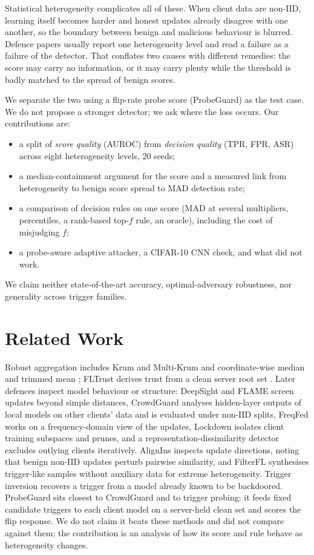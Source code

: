 Statistical heterogeneity complicates all of these. When client data are non-IID, learning itself becomes harder \cite{li2022niid} and honest updates already disagree with one another, so the boundary between benign and malicious behaviour is blurred. Defence papers usually report one heterogeneity level and read a failure as a failure of the detector. That conflates two causes with different remedies: the score may carry no information, or it may carry plenty while the threshold is badly matched to the spread of benign scores.

We separate the two using a flip-rate probe score (ProbeGuard) as the test case. We do not propose a stronger detector; we ask where the loss occurs. Our contributions are:
\begin{itemize}
\item a split of \emph{score quality} (AUROC) from \emph{decision quality} (TPR, FPR, ASR) across eight heterogeneity levels, 20 seeds;
\item a median-containment argument for the score and a measured link from heterogeneity to benign score spread to MAD detection rate;
\item a comparison of decision rules on one score (MAD at several multipliers, percentiles, a rank-based top-$f$ rule, an oracle), including the cost of misjudging $f$;
\item a probe-aware adaptive attacker, a CIFAR-10 CNN check, and what did not work.
\end{itemize}
We claim neither state-of-the-art accuracy, optimal-adversary robustness, nor generality across trigger families.

\section{Related Work}
Robust aggregation includes Krum and Multi-Krum \cite{blanchard2017} and coordinate-wise median and trimmed mean \cite{yin2018}; FLTrust derives trust from a clean server root set \cite{cao2021}. Later defences inspect model behaviour or structure: DeepSight and FLAME \cite{rieger2022,nguyen2022} screen updates beyond simple distances, CrowdGuard \cite{rieger2024} analyses hidden-layer outputs of local models on other clients' data and is evaluated under non-IID splits, FreqFed \cite{fereidooni2024} works on a frequency-domain view of the updates, Lockdown \cite{huang2023} isolates client training subspaces and prunes, and a representation-dissimilarity detector \cite{zhang2025} excludes outlying clients iteratively. AlignIns \cite{xu2025} inspects update directions, noting that benign non-IID updates perturb pairwise similarity, and FilterFL \cite{yang2025} synthesises trigger-like samples without auxiliary data for extreme heterogeneity. Trigger inversion \cite{xu2024} recovers a trigger from a model already known to be backdoored. ProbeGuard sits closest to CrowdGuard and to trigger probing: it feeds fixed candidate triggers to each client model on a server-held clean set and scores the flip response. We do not claim it beats these methods and did not compare against them; the contribution is an analysis of how its score and rule behave as heterogeneity changes.


